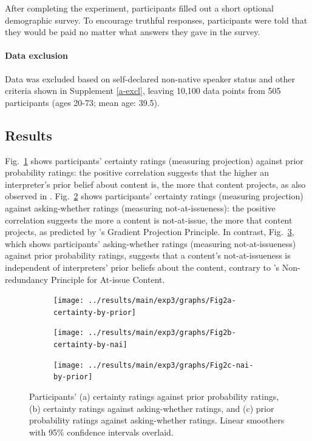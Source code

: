 \documentclass[11pt,fleqn]{article}
\newcommand{\6}{\mbox{$[\hspace*{-.6mm}[$}}
\newcommand{\9}{\mbox{$]\hspace*{-.6mm}]$}}
\newcommand{\citepos}[1]{\citeauthor{#1}'s \citeyear{#1}}
\begin{document}
After completing the experiment, participants filled out a short optional demographic survey. To encourage truthful responses, participants were told that they would be paid no matter what answers they gave in the survey.

\paragraph{Data exclusion} Data was excluded based on self-declared non-native speaker status and other criteria shown in Supplement \ref{a-excl}, leaving 10,100 data points from 505 participants (ages 20-73; mean age: 39.5).

\subsection{Results}

Fig.~\ref{fig:certainty-by-prior} shows participants' certainty ratings (measuring projection) against prior probability ratings: the positive correlation suggests that the higher an interpreter's prior belief about content is, the more that content projects, as also observed in \citealt{degen-tonhauser-openmind}. Fig.~\ref{fig:certainty-by-nai} shows participants' certainty ratings (measuring projection) against asking-whether ratings (measuring not-at-issueness): the positive correlation suggests the more a content is not-at-issue, the more that content projects, as predicted by \citepos{tbd-variability} Gradient Projection Principle. In contrast, Fig.~\ref{fig:prior-by-nai}, which shows participants' asking-whether ratings (measuring not-at-issueness) against prior probability ratings, suggests that a content's not-at-issueness is independent of interpreters' prior beliefs about the content, contrary to \citepos{tonhauser-etal-eval} Non-redundancy Principle for At-issue Content.

\begin{figure}[h!]
\centering
\begin{subfigure}[t]{0.33\textwidth}
\texttt{[image: ../results/main/exp3/graphs/Fig2a-certainty-by-prior]}
\caption{}\label{fig:certainty-by-prior}
\end{subfigure} \hfill
\begin{subfigure}[t]{0.33\textwidth}
\texttt{[image: ../results/main/exp3/graphs/Fig2b-certainty-by-nai]}
\caption{}\label{fig:certainty-by-nai}
 \end{subfigure}\hfill
 \begin{subfigure}[t]{0.33\textwidth}
\texttt{[image: ../results/main/exp3/graphs/Fig2c-nai-by-prior]}
\caption{}\label{fig:prior-by-nai}
\end{subfigure} 
\caption{Participants' (a) certainty ratings against prior probability ratings,  (b) certainty ratings against asking-whether ratings, and (c) prior probability ratings against asking-whether ratings. Linear smoothers with 95\% confidence intervals overlaid.}\label{fig:results}
\end{figure}
\end{document}

